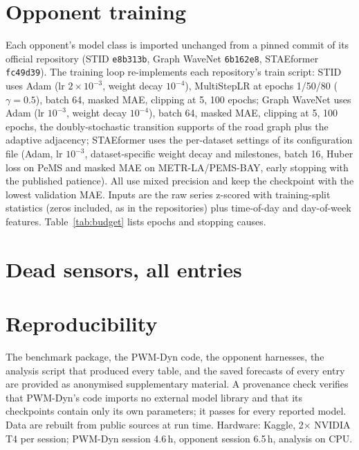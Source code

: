 \section{Opponent training}
\label{app:opp}

Each opponent's model class is imported unchanged from a pinned commit of its official repository (STID
\texttt{e8b313b}, Graph WaveNet \texttt{6b162e8}, STAEformer \texttt{fc49d39}). The training loop re-implements each
repository's train script: STID uses Adam (lr $2\times10^{-3}$, weight decay $10^{-4}$), MultiStepLR at epochs 1/50/80
($\gamma=0.5$), batch 64, masked MAE, clipping at 5, 100 epochs; Graph WaveNet uses Adam (lr $10^{-3}$, weight decay
$10^{-4}$), batch 64, masked MAE, clipping at 5, 100 epochs, the doubly-stochastic transition supports of the road graph
plus the adaptive adjacency; STAEformer uses the per-dataset settings of its configuration file (Adam, lr $10^{-3}$,
dataset-specific weight decay and milestones, batch 16, Huber loss on PeMS and masked MAE on METR-LA/PEMS-BAY, early
stopping with the published patience). All use mixed precision and keep the checkpoint with the lowest validation MAE.
Inputs are the raw series z-scored with training-split statistics (zeros included, as in the repositories) plus
time-of-day and day-of-week features. Table~\ref{tab:budget} lists epochs and stopping causes.



\section{Dead sensors, all entries}


\section{Reproducibility}

The benchmark package, the PWM-Dyn code, the opponent harnesses, the analysis script that produced every table, and
the saved forecasts of every entry are provided as anonymised supplementary material. A provenance check verifies
that PWM-Dyn's code imports no external model library and that its checkpoints contain only its own parameters; it
passes for every reported model. Data are rebuilt from public sources at run time. Hardware: Kaggle, 2$\times$ NVIDIA
T4 per session; PWM-Dyn session 4.6\,h, opponent session 6.5\,h, analysis on CPU.
